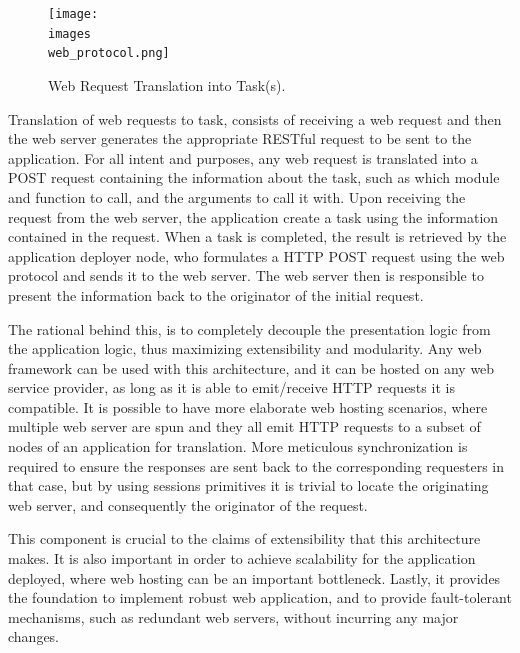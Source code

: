 \documentclass[12pt, titlepage]{uo_temp}
\begin{document}
     \begin{figure}[h]
       \texttt{[image: \\images\\web\_protocol.png]}
       \caption{Web Request Translation into Task(s).}
     \end{figure}
     Translation of web requests to task, consists of receiving a web request and then the
     web server generates the appropriate RESTful request to be sent to the
     application. For all intent and purposes, any web request is translated into a POST
     request containing the information about the task, such as which module and function
     to call, and the arguments to call it with. Upon receiving the request from the web
     server, the application create a task using the information contained in the request.
     When a task is completed, the result is retrieved by the application deployer node,
     who formulates a HTTP POST request using the web protocol and sends it to the web
     server. The web server then is responsible to present the information back to the
     originator of the initial request.

     The rational behind this, is to completely decouple the presentation logic from the
     application logic, thus maximizing extensibility and modularity. Any web framework
     can be used with this architecture, and it can be hosted on any web service
     provider, as long as it is able to emit/receive HTTP requests it is compatible. 
     It is possible to have more elaborate web hosting scenarios, where multiple web
     server are spun and they all emit HTTP requests to a subset of nodes of an
     application for translation. More meticulous synchronization is required to ensure
     the responses are sent back to the corresponding requesters in that case, but by
     using sessions primitives it is trivial to locate the originating web server, and
     consequently the originator of the request.
     
     This component is crucial to the claims of extensibility that this architecture
     makes. It is also important in order to achieve scalability for the application
     deployed, where web hosting can be an important bottleneck. Lastly, it provides the
     foundation to implement robust web application, and to provide fault-tolerant
     mechanisms, such as redundant web servers, without incurring any major changes. 
 
\end{document}
